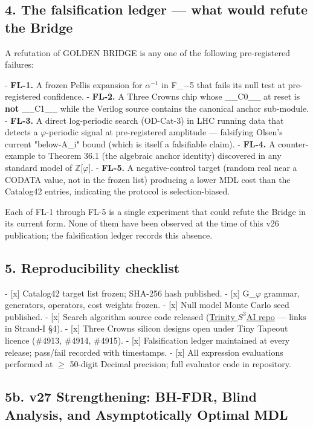\subsection{4. The falsification ledger --- what would refute the Bridge}

A refutation of GOLDEN BRIDGE is any one of the following pre-registered failures:

- \textbf{FL-1.} A frozen Pellis expansion for $\alpha^{-1}$ in F\_{$-$5} that fails its null test at pre-registered confidence.
- \textbf{FL-2.} A Three Crowns chip whose \_\_C0\_\_ at reset is \textbf{not} \_\_C1\_\_ while the Verilog source contains the canonical anchor sub-module.
- \textbf{FL-3.} A direct log-periodic search (OD-Cat-3) in LHC running data that detects a $\varphi$-periodic signal at pre-registered amplitude --- falsifying Olsen's current "below-A\_i" bound (which is itself a falsifiable claim).
- \textbf{FL-4.} A counter-example to Theorem 36.1 (the algebraic anchor identity) discovered in any standard model of $\mathbb{Z}$[$\varphi$].
- \textbf{FL-5.} A negative-control target (random real near a CODATA value, not in the frozen list) producing a lower MDL cost than the Catalog42 entries, indicating the protocol is selection-biased.

Each of FL-1 through FL-5 is a single experiment that could refute the Bridge in its current form. None of them have been observed at the time of this v26 publication; the falsification ledger records this absence.

\subsection{5. Reproducibility checklist}

- [x] Catalog42 target list frozen; SHA-256 hash published.
- [x] G\_$\varphi$ grammar, generators, operators, cost weights frozen.
- [x] Null model Monte Carlo seed published.
- [x] Search algorithm source code released (\href{https://github.com/}{Trinity $S^{3}$AI repo} --- links in Strand-I §4).
- [x] Three Crowns silicon designs open under Tiny Tapeout licence (\#4913, \#4914, \#4915).
- [x] Falsification ledger maintained at every release; pass/fail recorded with timestamps.
- [x] All expression evaluations performed at $\geq$ 50-digit Decimal precision; full evaluator code in repository.



\subsection{5b. v27 Strengthening: BH-FDR, Blind Analysis, and Asymptotically Optimal MDL}

